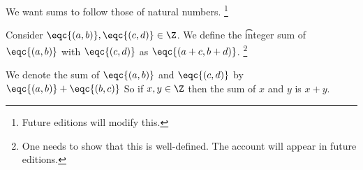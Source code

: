 

We want sums to follow those of natural numbers.
  \ifhmode\unskip\fi\footnote{
Future editions will modify this.
  }


Consider $\eqc{(a, b)}, \eqc{(c, d)} \in \Z $.
We define the \t{integer sum} of $\eqc{(a, b)}$ with $\eqc{(c, d)}$ as $\eqc{(a + c, b + d)}$.
  \ifhmode\unskip\fi\footnote{
One needs to show that this is well-defined. The account will appear in future editions.
  }


We denote the sum of $\eqc{(a, b)}$ and $\eqc{(c, d)}$ by $\eqc{(a, b)} + \eqc{(b, c)}$
So if $x, y \in \Z $ then the sum of $x$ and $y$ is $x + y$.

\blankpage
